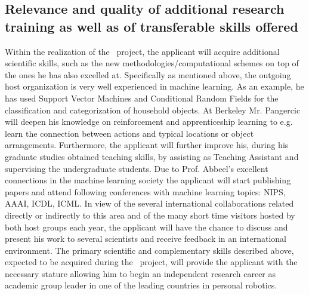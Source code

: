 \subsection{Relevance and quality of additional research training as well as of transferable skills offered}
\label{sec:trans_skills}
Within the realization of the  \ksem\ project, the applicant will acquire additional 
scientific skills, such as the new methodologies/computational schemes on top of the 
ones he has also excelled at. Specifically as mentioned above, the outgoing host organization 
is very well experienced in machine learning.  As an example, he has used Support Vector Machines
and Conditional Random Fields for the classification and categorization of household objects.
At Berkeley Mr. Pangercic will deepen his knowledge on reinforcement and apprenticeship learning
to e.g. learn the connection between actions and typical locations or object arrangements.
Furthermore, the applicant will further improve his, during his graduate studies obtained teaching 
skills, by assisting as Teaching Assistant and supervising the undergraduate students.
Due to Prof. Abbeel's excellent connections in the machine learning society the applicant 
will start publishing papers and attend following conferences with machine learning topics:
NIPS, AAAI, ICDL, ICML. In view of the several international collaborations related directly 
or indirectly to this area and of the many short time visitors hosted by both host groups each year, 
the applicant will have the  chance to discuss and present his work to several scientists and 
receive feedback in an international environment. The primary scientific and 
complementary skills described above, expected to be acquired during the \ksem\ 
project, will provide the applicant  with  the necessary stature allowing  him to begin an 
independent research career as academic group leader in one of the leading countries in personal
robotics.
